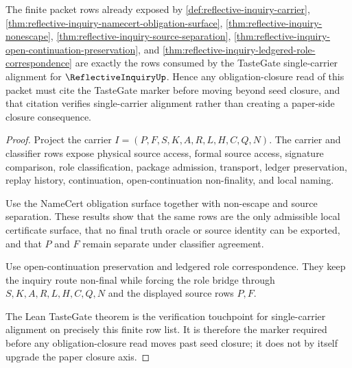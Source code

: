 \begin{theorem}
\label{thm:reflective-inquiry-tastegate-obligation-closure}
The finite packet rows already exposed by \autoref{def:reflective-inquiry-carrier}, \autoref{thm:reflective-inquiry-namecert-obligation-surface}, \autoref{thm:reflective-inquiry-nonescape}, \autoref{thm:reflective-inquiry-source-separation}, \autoref{thm:reflective-inquiry-open-continuation-preservation}, and \autoref{thm:reflective-inquiry-ledgered-role-correspondence} are exactly the rows consumed by the TasteGate single-carrier alignment for $\ReflectiveInquiryUp$. Hence any obligation-closure read of this packet must cite the TasteGate marker before moving beyond seed closure, and that citation verifies single-carrier alignment rather than creating a paper-side closure consequence.
\end{theorem}
\begin{proof}
Project the carrier $I=(P,F,S,K,A,R,L,H,C,Q,N)$. The carrier and classifier rows expose physical source access, formal source access, signature comparison, role classification, package admission, transport, ledger preservation, replay history, continuation, open-continuation non-finality, and local naming.

Use the NameCert obligation surface together with non-escape and source separation. These results show that the same rows are the only admissible local certificate surface, that no final truth oracle or source identity can be exported, and that $P$ and $F$ remain separate under classifier agreement.

Use open-continuation preservation and ledgered role correspondence. They keep the inquiry route non-final while forcing the role bridge through $S,K,A,R,L,H,C,Q,N$ and the displayed source rows $P,F$.

The Lean TasteGate theorem is the verification touchpoint for single-carrier alignment on precisely this finite row list. It is therefore the marker required before any obligation-closure read moves past seed closure; it does not by itself upgrade the paper closure axis.
\end{proof}


